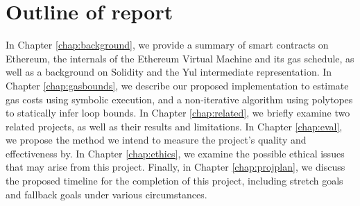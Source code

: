 \section{Outline of report}

In Chapter \ref{chap:background}, we provide a summary of smart contracts on Ethereum, the internals of the
Ethereum Virtual Machine and its gas schedule, as well as a background on Solidity and the 
Yul intermediate representation. In Chapter \ref{chap:gasbounds}, we describe our proposed
implementation to estimate gas costs using symbolic execution, and a non-iterative algorithm using
polytopes to statically infer loop bounds. In Chapter \ref{chap:related}, we briefly examine two 
related projects, as well as their results and limitations. In Chapter \ref{chap:eval}, we 
propose the method we intend to measure the project's quality and effectiveness by. In 
Chapter \ref{chap:ethics}, we examine the possible ethical issues that may arise from 
this project. Finally, in Chapter \ref{chap:projplan}, we discuss the proposed timeline 
for the completion of this project, including stretch goals and fallback goals under various
circumstances.
